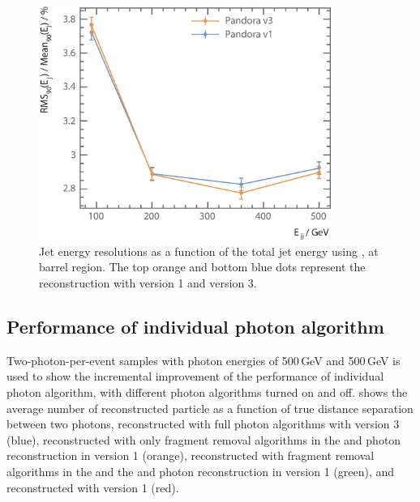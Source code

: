 



\begin{figure}[tbph]
\centering
\includegraphics[width=0.85\textwidth]{photon/JERnew2}
\caption[Jet energy resolution as a function of the di-jet energy]
{Jet energy resolutions as a function of the total jet energy using \eeZuds, at barrel region. The top orange and bottom blue dots represent the  reconstruction with \pandora version 1 and version 3.}
\label{fig:photonJER}
\end{figure}


\subsection{Performance of individual photon algorithm}




Two-photon-per-event samples with photon energies of  500\,GeV and 500\,GeV is used to show the incremental improvement of the performance of individual photon algorithm, with different photon algorithms turned on and off.  shows the average number of reconstructed particle as a function of true distance separation between two photons, reconstructed with full photon algorithms with \pandora version 3 (blue), reconstructed with only fragment removal algorithms in the \ECAL and photon reconstruction in  \pandora version 1 (orange), reconstructed with fragment removal algorithms in the \ECAL and the \HCAL and photon reconstruction in  \pandora version 1 (green), and reconstructed with \pandora version 1 (red).

